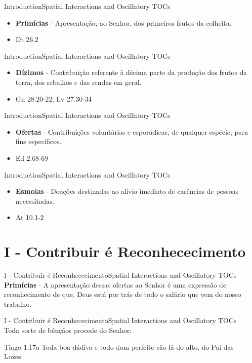 \documentclass[14pt,aspectratio=169]{beamer}
\newcommand{\TT}{Spatial Interactions and Oscillatory TOCs}
\newcommand{\IN}{Introduction}
\newcommand{\PI}{I - Contribuir é Reconhececimento}
\begin{document}
\begin{frame}{\IN}{\TT}
 \begin{itemize}
  \item \textbf{Primícias} \pause - Apresentação, ao Senhor, dos primeiros frutos da colheita.
  \item[] Dt 26.2
 \end{itemize}
\end{frame}

\begin{frame}{\IN}{\TT}
 \begin{itemize}
  \item \textbf{Dízimos} \pause - Contribuição referente à décima parte da produção dos frutos da terra, dos rebalhos e das rendas em geral.
  \item[] Gn 28.20-22; Lv 27.30-34
 \end{itemize}
\end{frame}

\begin{frame}{\IN}{\TT}
 \begin{itemize}
  \item \textbf{Ofertas} \pause - Contribuições voluntárias e esporádicas, de qualquer espécie, para fins específicos.
  \item[] Ed 2.68-69
 \end{itemize}
\end{frame}

\begin{frame}{\IN}{\TT}
 \begin{itemize}
  \item \textbf{Esmolas} \pause - Doações destinadas ao alívio imediato de carências de pessoas necessitadas.
  \item[] At 10.1-2
 \end{itemize}
\end{frame}

\section{\PI}
\begin{frame}{\PI}{\TT}\pause
 \textbf{Primícias} - A apresentação dessas ofertas ao Senhor é uma expressão de reconhecimento de que, Deus está por trás de todo o salário que vem do nosso trabalho.
\end{frame}

\begin{frame}{\PI}{\TT}
 Toda sorte de bênçãos procede do Senhor:\pause
 \begin{block}{Tiago 1.17a}
 Toda boa dádiva e todo dom perfeito são lá do alto, do Pai das Luzes.
 \end{block}
\end{frame}
\end{document}
